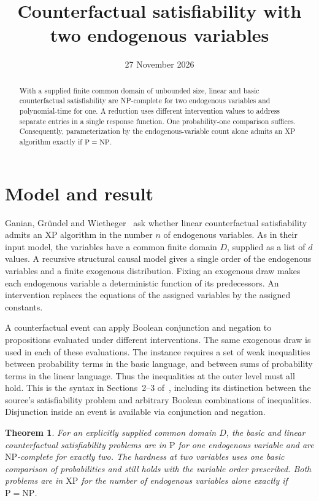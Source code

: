 \documentclass[11pt]{amsart}
\title{Counterfactual satisfiability with two endogenous variables}
\date{27 November 2026}
\newtheorem{theorem}{Theorem}
\begin{document}
\begin{abstract}
With a supplied finite common domain of unbounded size, linear and basic counterfactual satisfiability are NP-complete for two endogenous variables and polynomial-time for one. A reduction uses different intervention values to address separate entries in a single response function. One probability-one comparison suffices. Consequently, parameterization by the endogenous-variable count alone admits an XP algorithm exactly if \(\mathrm{P}=\mathrm{NP}\).
\end{abstract}
\maketitle

\section{Model and result}
Ganian, Gr\"undel and Wietheger~\cite[\S6, third item]{GGW} ask whether linear counterfactual satisfiability admits an XP algorithm in the number \(n\) of endogenous variables. As in their input model, the variables have a common finite domain \(D\), supplied as a list of \(d\) values. A recursive structural causal model gives a single order of the endogenous variables and a finite exogenous distribution. Fixing an exogenous draw makes each endogenous variable a deterministic function of its predecessors. An intervention replaces the equations of the assigned variables by the assigned constants.

A counterfactual event can apply Boolean conjunction and negation to propositions evaluated under different interventions. The same exogenous draw is used in each of these evaluations. The instance requires a set of weak inequalities between probability terms in the basic language, and between sums of probability terms in the linear language. Thus the inequalities at the outer level must all hold. This is the syntax in Sections~2--3 of~\cite{GGW}, including its distinction between the source's satisfiability problem and arbitrary Boolean combinations of inequalities. Disjunction inside an event is available via conjunction and negation.

\begin{theorem}
For an explicitly supplied common domain \(D\), the basic and linear counterfactual satisfiability problems are in \(\mathrm{P}\) for one endogenous variable and are \(\mathrm{NP}\)-complete for exactly two. The hardness at two variables uses one basic comparison of probabilities and still holds with the variable order prescribed. Both problems are in \(\mathrm{XP}\) for the number of endogenous variables alone exactly if \(\mathrm{P}=\mathrm{NP}\).
\end{theorem}
\end{document}
